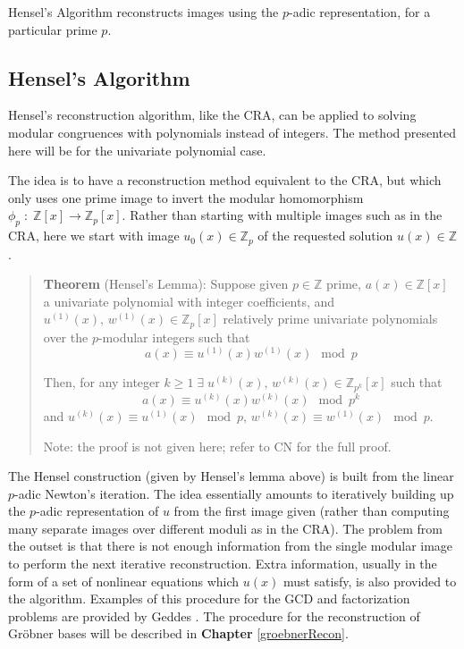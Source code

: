 \documentclass[letterpaper,12pt,titlepage,oneside,final]{book}
\newenvironment{theorem}{\begin{quote}%
  \textbf{Theorem }%
  \quad
}{%
\end{quote}%
}
\begin{document}
Hensel's Algorithm reconstructs images using the ${p}$-adic representation, for a particular prime ${p}$.

\subsection{Hensel's Algorithm}

Hensel's reconstruction algorithm, like the CRA, can be applied to solving modular congruences with polynomials instead of integers.  The method presented here will be for the univariate polynomial case.  

The idea is to have a reconstruction method equivalent to the CRA, but which only uses one prime image to invert the modular homomorphism ${\phi_p\; : \; \mathbb{Z}[x] \rightarrow \mathbb{Z}_p[x]}$.  Rather than starting with multiple images such as in the CRA, here we start with image ${u_0(x) \in \mathbb{Z}_p}$ of the requested solution ${u(x) \in \mathbb{Z}}$.

\begin{theorem}\label{hensel's lemma}
  (Hensel's Lemma): Suppose given ${p \in \mathbb{Z}}$ prime, ${a(x) \in \mathbb{Z}[x]}$ a univariate polynomial with integer coefficients, and ${u^{(1)}(x),\, w^{(1)}(x) \in \mathbb{Z}_p[x]}$ relatively prime univariate polynomials over the ${p}$-modular integers such that
  \begin{equation*}
    a(x) \equiv u^{(1)}(x)w^{(1)}(x) \mod p
  \end{equation*}

  Then, for any integer ${k \geq 1 \; \exists \; u^{(k)}(x),\, w^{(k)}(x) \in \mathbb{Z}_{p^k}[x]}$ such that 
  \begin{equation*}
    a(x) \equiv u^{(k)}(x)w^{(k)}(x) \mod p^k
  \end{equation*}
  and ${u^{(k)}(x) \equiv u^{(1)}(x) \mod p}$, ${w^{(k)}(x) \equiv w^{(1)}(x) \mod p}$. 

  Note: the proof is not given here; refer to CN for the full proof.
\end{theorem}           

The Hensel construction (given by Hensel's lemma above) is built from the linear ${p}$-adic Newton's iteration.  The idea essentially amounts to iteratively building up the ${p}$-adic representation of ${u}$ from the first image given (rather than computing many separate images over different moduli as in the CRA).  The problem from the outset is that there is not enough information from the single modular image to perform the next iterative reconstruction.  Extra information, usually in the form of a set of nonlinear equations which ${u(x)}$ must satisfy, is also provided to the algorithm.  Examples of this procedure for the GCD and factorization problems are provided by Geddes \cite{Geddes}.  The procedure for the reconstruction of Gr\"obner bases will be described in \textbf{Chapter} \ref{groebnerRecon}. 
\end{document}
